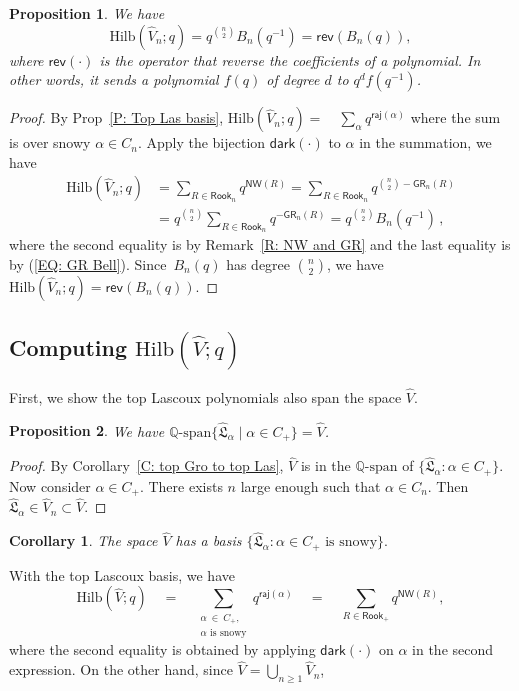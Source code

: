 \documentclass[10pt]{amsart}
\theoremstyle{plain}
\newtheorem{cor}[cor]{Corollary}
\theoremstyle{plain}
\theoremstyle{definition}
\theoremstyle{definition}
\theoremstyle{definition}
\theoremstyle{plain}
\theoremstyle{plain}
\theoremstyle{plain}
\theoremstyle{plain}
\newtheorem{prop}[prop]{Proposition}
\theoremstyle{plain}
\theoremstyle{remark}
\theoremstyle{remark}
\theoremstyle{plain}
\theoremstyle{plain}
\newcommand{\fL}{\mathfrak{L}}
\newcommand{\topLas}{\widehat{\fL}}
\newcommand{\rev}{\mathsf{rev}}
\newcommand{\Q}{\mathbb{Q}}
\newcommand{\dark}{\mathsf{dark}}
\newcommand{\raj}{\mathsf{raj}}
\newcommand{\Rook}{\mathsf{Rook}}
\newcommand{\GR}{\mathsf{GR}}
\newcommand{\NW}{\mathsf{NW}}
\newcommand{\Hilb}{\mathrm{Hilb}}
\begin{document}
\begin{prop}
\label{T: F_n}
We have
$$
\Hilb(\widehat{V}_n;q) 
= q^{{\binom{n}{2}}} B_{n}(q^{-1})
= \rev(B_n(q)),
$$
where $\rev(\cdot)$ is the operator that
reverse the coefficients of a polynomial.
In other words, it sends a polynomial $f(q)$
of degree $d$ to $q^d f(q^{-1})$.
\end{prop}
\begin{proof}

By Prop~\ref{P: Top Las basis},
$
\Hilb(\widehat{V}_n;q) = \quad \sum_{\alpha} q^{\raj(\alpha)}$
where the sum is over snowy $\alpha \in C_n$.
Apply the bijection $\dark(\cdot)$
to $\alpha$ in the summation, we have
\begin{align*}
\Hilb(\widehat{V}_n;q) & = \sum_{R \in \Rook_n} q^{\NW(R)} =\sum_{R \in \Rook_n} q^{{\binom{n}{2}} - \GR_n(R)}\\
&=q^{\binom{n}{2}}\sum_{R \in \Rook_n} q^{-\GR_n(R)} = q^{{\binom{n}{2}}} B_{n}(q^{-1})\,,
\end{align*}
where the second equality is by 
Remark~\ref{R: NW and GR}
and the last equality is by (\ref{EQ: GR Bell}).
Since~$B_n(q)$ has degree ${\binom{n}{2}}$, we have $\Hilb(\widehat{V}_n;q) = \rev(B_n(q))$.
\end{proof}

\subsection{Computing  \texorpdfstring{$\Hilb(\widehat{V};q)$}{TEXT}}\label{subsec.v.hat}

First, we show the top Lascoux polynomials also span the space $\widehat{V}$.
\begin{prop}
\label{P: V span}
We have $\Q\textrm{-span}\{\topLas_\alpha \mid \alpha \in C_+\} = \widehat{V}$.
\end{prop}
\begin{proof}
By Corollary~\ref{C: top Gro to top Las},
$\widehat{V}$ is in the $\Q\textrm{-span}$ of 
$\{\topLas_\alpha: \alpha \in C_+\}$.
Now consider $\alpha \in C_+$.
There exists $n$ large enough such that
$\alpha \in C_n$.
Then $\topLas_\alpha \in \widehat{V}_n \subset \widehat{V}$.
\end{proof}

\begin{cor}
The space $\widehat{V}$
has a basis 
$\{ \topLas_\alpha: \alpha \in C_+ \textrm{ is snowy}\}.$
\end{cor}

With the top Lascoux basis, we have
$$
\Hilb(\widehat{V};q)  \quad = \quad \sum_{\substack{\alpha \: \in \: C_+, \\ 
\alpha \textrm{ is snowy}}} q^{\raj(\alpha)} \quad
= \quad \sum_{R \in \Rook_+} q^{\NW(R)},$$
where the second equality is obtained by 
applying $\dark(\cdot)$ on $\alpha$ in the second expression.
On the other hand, since $\widehat{V} = \bigcup_{n \geq 1} \widehat{V}_n$, 
\end{document}
